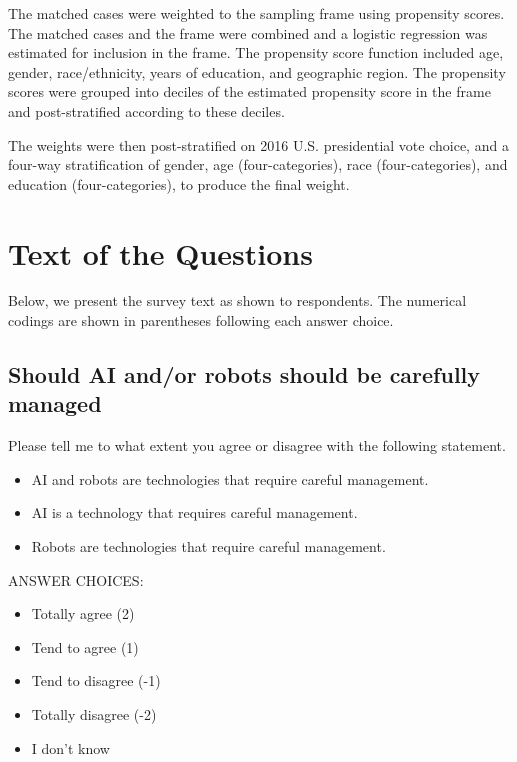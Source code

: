 \documentclass{article}
\begin{document}
The matched cases were weighted to the sampling frame using propensity scores. The matched cases and the frame were combined and a logistic regression was estimated for inclusion in the frame. The propensity score function included age, gender, race/ethnicity, years of education, and geographic region. The propensity scores were grouped into deciles of the estimated propensity score in the frame and post-stratified according to these deciles.

The weights were then post-stratified on 2016 U.S. presidential vote choice, and a four-way stratification of gender, age (four-categories), race (four-categories), and education (four-categories), to produce the final weight.

\section{Text of the Questions}

Below, we present the survey text as shown to respondents. The numerical codings are shown in parentheses following each answer choice. 

\subsection{Should AI and/or robots should be carefully managed}

\noindent Please tell me to what extent you agree or disagree with the following statement.


\begin{itemize}
\item AI and robots are technologies that require careful management.
\item AI is a technology that requires careful management.
\item Robots are technologies that require careful management.
\end{itemize}

\noindent ANSWER CHOICES:
\begin{itemize}
\item Totally agree (2)
\item Tend to agree (1)
\item Tend to disagree (-1)
\item Totally disagree (-2)
\item I don’t know
\end{itemize}
\end{document}
